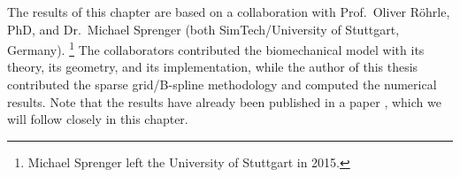 The results of this chapter are based on a collaboration with
Prof.\ Oliver Röhrle, PhD, and Dr.\ Michael Sprenger
(both SimTech/University of Stuttgart, Germany).%
\footnote{%
  Michael Sprenger left the University of Stuttgart in 2015.%
}
The collaborators contributed the biomechanical model
with its theory, its geometry, and its implementation,
while the author of this thesis contributed the
sparse grid/B-spline methodology and
computed the numerical results.
Note that the results have already been
published in a paper \cite{Valentin18Gradient},
which we will follow closely in this chapter.





\cleardoublepage
